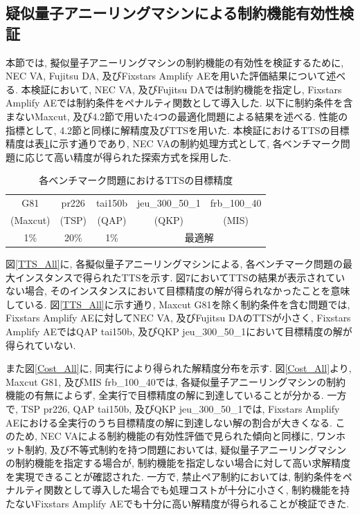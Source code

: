\documentclass[submit,techrep,noauthor]{ipsj}
\begin{document}
\subsection{疑似量子アニーリングマシンによる制約機能有効性検証}
本節では, 擬似量子アニーリングマシンの制約機能の有効性を検証するために, NEC VA, Fujitsu DA, 及びFixstars Amplify AEを用いた評価結果について述べる. 本検証において, NEC VA, 及びFujitsu DAでは制約機能を指定し, Fixstars Amplify AEでは制約条件をペナルティ関数として導入した. 以下に制約条件を含まないMaxcut, 及び4.2節で用いた4つの最適化問題による結果を述べる. 性能の指標として, 4.2節と同様に解精度及びTTSを用いた. 本検証におけるTTSの目標精度は表\ref{table_target2}に示す通りであり, NEC VAの制約処理方式として, 各ベンチマーク問題に応じて高い精度が得られた探索方式を採用した.

\begin{table}[tb]
\centering
  \caption{各ベンチマーク問題におけるTTSの目標精度}
    \begin{tabular}{|c|c|c|c|c|}
      \hline
      G81 & pr226 & tai150b & jeu\_300\_50\_1 & frb\_100\_40\\
      (Maxcut) & (TSP) & (QAP) & (QKP) & (MIS)\\
      \cline{1-1} \cline{2-2} \cline{3-3} \cline{4-4} \cline{5-5}
       1\% & 20\% & 1\% & \multicolumn{2}{|c|}{最適解}\\ \hline
    \end{tabular}
\label{table_target2}
\end{table}

図\ref{TTS_All}に, 各擬似量子アニーリングマシンによる, 各ベンチマーク問題の最大インスタンスで得られたTTSを示す. 図7においてTTSの結果が表示されていない場合, そのインスタンスにおいて目標精度の解が得られなかったことを意味している. 図\ref{TTS_All}に示す通り, Maxcut G81を除く制約条件を含む問題では, Fixstars Amplify AEに対してNEC VA, 及びFujitsu DAのTTSが小さく, Fixstars Amplify AEではQAP tai150b, 及びQKP jeu\_300\_50\_1において目標精度の解が得られていない. 

また図\ref{Cost_All}に, 同実行により得られた解精度分布を示す. 図\ref{Cost_All}より, Maxcut G81, 及びMIS frb\_100\_40では, 各疑似量子アニーリングマシンの制約機能の有無によらず, 全実行で目標精度の解に到達していることが分かる. 一方で, TSP pr226, QAP tai150b, 及びQKP jeu\_300\_50\_1では, Fixstars Amplify AEにおける全実行のうち目標精度の解に到達しない解の割合が大きくなる. このため, NEC VAによる制約機能の有効性評価で見られた傾向と同様に, ワンホット制約, 及び不等式制約を持つ問題においては, 疑似量子アニーリングマシンの制約機能を指定する場合が, 制約機能を指定しない場合に対して高い求解精度を実現できることが確認された. 一方で, 禁止ペア制約においては, 制約条件をペナルティ関数として導入した場合でも処理コストが十分に小さく, 制約機能を持たないFixstars Amplify AEでも十分に高い解精度が得られることが検証できた. 
\end{document}
